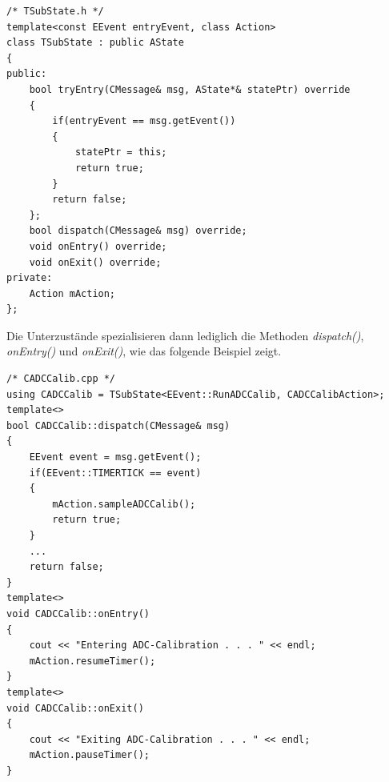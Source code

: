 \begin{lstlisting}[caption={Templateklasse für einfache Versuchszustände},captionpos=b]
/* TSubState.h */
template<const EEvent entryEvent, class Action>
class TSubState : public AState
{
public:
	bool tryEntry(CMessage& msg, AState*& statePtr) override
	{
		if(entryEvent == msg.getEvent())
		{
			statePtr = this;
			return true;
		}
		return false;
	};
	bool dispatch(CMessage& msg) override;
	void onEntry() override;
	void onExit() override;
private:
	Action mAction;
};
\end{lstlisting}
Die Unterzustände spezialisieren dann lediglich die Methoden \textit{dispatch()}, \textit{onEntry()} und \textit{onExit()}, wie das folgende Beispiel zeigt.
\begin{lstlisting}[caption={Beispielhafte Instantiierung des Versuchstemplate},captionpos=b]
/* CADCCalib.cpp */
using CADCCalib = TSubState<EEvent::RunADCCalib, CADCCalibAction>;
template<>
bool CADCCalib::dispatch(CMessage& msg)
{
	EEvent event = msg.getEvent();
	if(EEvent::TIMERTICK == event)
	{
		mAction.sampleADCCalib();
		return true;
	}
	...
	return false;
}
template<>
void CADCCalib::onEntry()
{
	cout << "Entering ADC-Calibration . . . " << endl;
	mAction.resumeTimer();
}
template<>
void CADCCalib::onExit()
{
	cout << "Exiting ADC-Calibration . . . " << endl;
	mAction.pauseTimer();
}
\end{lstlisting}